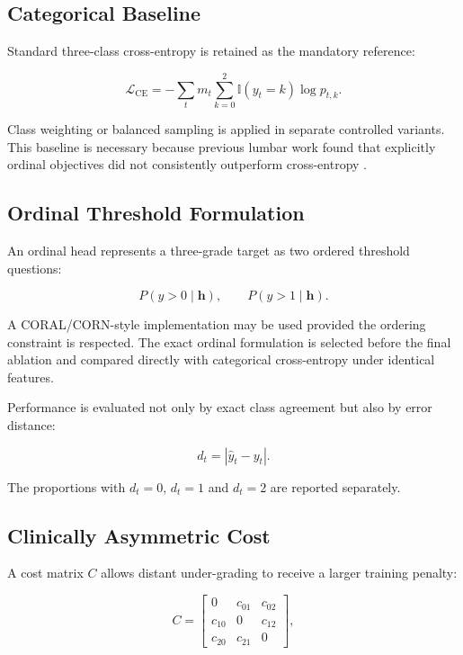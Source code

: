 \subsection{Categorical Baseline}
\label{sec:method-ce}

Standard three-class cross-entropy is retained as the mandatory reference:

\begin{equation}
\mathcal{L}_{\mathrm{CE}}
=
-\sum_{t}m_t
\sum_{k=0}^{2}
\mathbb{I}(y_t=k)\log p_{t,k}.
\label{eq:cross-entropy}
\end{equation}

Class weighting or balanced sampling is applied in separate controlled variants.
This baseline is necessary because previous lumbar work found that explicitly
ordinal objectives did not consistently outperform cross-entropy
\cite{niemeyer2021a}.

\subsection{Ordinal Threshold Formulation}
\label{sec:method-ordinal-threshold}

An ordinal head represents a three-grade target as two ordered threshold
questions:

\[
P(y>0\mid\mathbf{h}), \qquad
P(y>1\mid\mathbf{h}).
\]

A CORAL/CORN-style implementation may be used provided the ordering constraint
is respected. The exact ordinal formulation is selected before the final
ablation and compared directly with categorical cross-entropy under identical
features.

Performance is evaluated not only by exact class agreement but also by error
distance:

\begin{equation}
d_t=|\hat{y}_t-y_t|.
\label{eq:grade-distance}
\end{equation}

The proportions with $d_t=0$, $d_t=1$ and $d_t=2$ are reported separately.

\subsection{Clinically Asymmetric Cost}
\label{sec:method-cost}

A cost matrix $C$ allows distant under-grading to receive a larger training
penalty:

\begin{equation}
C=
\begin{bmatrix}
0 & c_{01} & c_{02}\\
c_{10} & 0 & c_{12}\\
c_{20} & c_{21} & 0
\end{bmatrix},
\label{eq:cost-matrix}
\end{equation}

